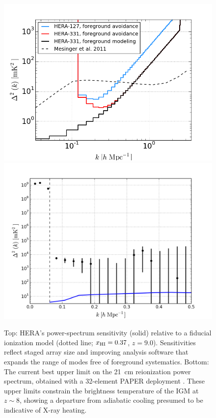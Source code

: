 \documentclass[ars]{/Users/daviddeboer1/Documents/Papers/Copernicus_LaTeX_Package_v_2_7/copernicus}
\def\HI{{H{\small I }}}
\def\xHI{{x_{\rm\HI}}}
\begin{document}
\begin{figure}[t]\centering
\includegraphics[width=\columnwidth]{plots/eor_pspec_2014.png}
\includegraphics[width=\columnwidth]{plots/hera_pk3pk.png}
\caption{\small Top: HERA's power-spectrum sensitivity (solid)
relative to a fiducial ionization model (dotted line; $\xHI=0.37$, $z=9.0$).  
Sensitivities reflect staged array size and
improving analysis software that expands the range
of modes free of foreground systematics. 
Bottom: The current best upper limit on the 21~cm reionization power spectrum,
obtained with a 32-element PAPER deployment \citep{parsons_et_al2013}.  These upper limits
constrain the brightness temperature of the IGM at $z\sim8$, showing
a departure from adiabatic cooling presumed to be indicative of X-ray heating.
}\label{fig:eor_pspec}
\end{figure}
\end{document}
